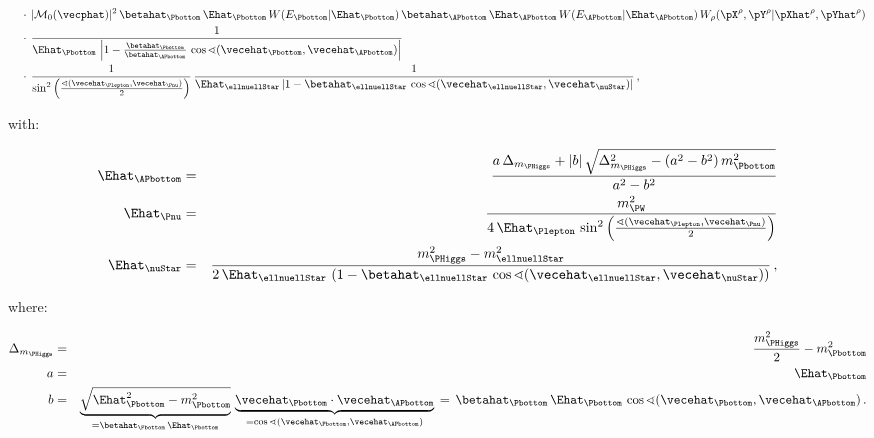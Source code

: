 \begin{linenowrapper}
\begin{align}
 & \quad \cdot \, \vert \mathcal{M}_{0}(\vecphat) \vert^{2} \, 
\betahat_{\Pbottom} \, \Ehat_{\Pbottom} \, W(E_{\Pbottom}|\Ehat_{\Pbottom}) \, 
\betahat_{\APbottom} \, \Ehat_{\APbottom} \, W(E_{\APbottom}|\Ehat_{\APbottom}) \,
W_{\rho}( \pX^{\rho},\pY^{\rho} | \pXhat^{\rho},\pYhat^{\rho} ) \nonumber \\
 & \quad \cdot \, \frac{1}{\Ehat_{\Pbottom} \, \left\lvert 1 - \frac{\betahat_{\Pbottom}}{\betahat_{\APbottom}} \, \cos\sphericalangle(\vecehat_{\Pbottom},\vecehat_{\APbottom}) \right\rvert} \nonumber \\
 & \quad \cdot \, \frac{1}{\sin^{2}\left(\frac{\sphericalangle(\vecehat_{\Plepton},\vecehat_{\Pnu})}{2}\right)} \,
\frac{1}{\Ehat_{\ellnuellStar} \left\lvert 1 - \betahat_{\ellnuellStar} \, \cos\sphericalangle(\vecehat_{\ellnuellStar},\vecehat_{\nuStar}) \right\rvert} \, ,
\label{eq:mem_signal}
\end{align}
\end{linenowrapper}
with:
\begin{linenowrapper}
\begin{eqnarray}
\Ehat_{\APbottom} & = & \frac{a \, \Delta_{m_{\PHiggs}} + |b| \, \sqrt{\Delta_{m_{\PHiggs}}^{2} - (a^{2} - b^{2}) \, m_{\Pbottom}^{2}}}{a^{2} - b^{2}} \nonumber \\
\Ehat_{\Pnu} & = & \frac{m_{\PW}^{2}}{4 \, \Ehat_{\Plepton} \, \sin^{2}\left(\frac{\sphericalangle(\vecehat_{\Plepton},\vecehat_{\Pnu})}{2}\right)} \nonumber \\
\Ehat_{\nuStar} & = & \frac{m_{\PHiggs}^{2} - m_{\ellnuellStar}^{2}}{2 \, \Ehat_{\ellnuellStar} \, 
 \left( 1 - \betahat_{\ellnuellStar} \, \cos\sphericalangle(\vecehat_{\ellnuellStar},\vecehat_{\nuStar}) \right)} \, ,
\end{eqnarray}
\end{linenowrapper}
where:
\begin{linenowrapper}
\begin{eqnarray}
\Delta_{m_{\PHiggs}} & = & \frac{m_{\PHiggs}^{2}}{2} - m_{\Pbottom}^{2} \nonumber \\
a & = & \Ehat_{\Pbottom} \nonumber \\
b & = & \underbrace{\sqrt{\Ehat_{\Pbottom}^{2} - m_{\Pbottom}^{2}}}_{= \betahat_{\Pbottom} \, \Ehat_{\Pbottom}} \, 
 \underbrace{\vecehat_{\Pbottom} \cdot \vecehat_{\APbottom}}_{= \cos\sphericalangle(\vecehat_{\Pbottom},\vecehat_{\APbottom})} \, 
= \, \betahat_{\Pbottom} \, \Ehat_{\Pbottom} \, \cos\sphericalangle(\vecehat_{\Pbottom},\vecehat_{\APbottom}) \, .
\end{eqnarray}
\end{linenowrapper}
